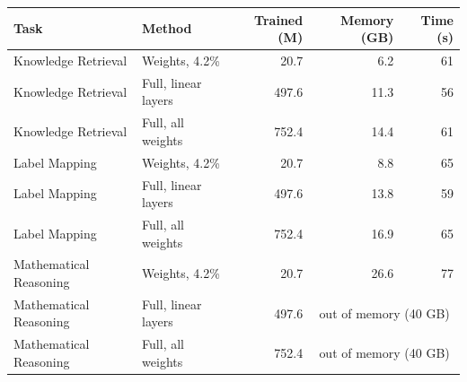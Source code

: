 \begin{tabular}{llrrr}
\toprule
Task & Method & Trained (M) & Memory (GB) & Time (s) \\
\midrule
Knowledge Retrieval & Weights, 4.2\% & 20.7 & 6.2 & 61 \\
Knowledge Retrieval & Full, linear layers & 497.6 & 11.3 & 56 \\
Knowledge Retrieval & Full, all weights & 752.4 & 14.4 & 61 \\
\midrule
Label Mapping & Weights, 4.2\% & 20.7 & 8.8 & 65 \\
Label Mapping & Full, linear layers & 497.6 & 13.8 & 59 \\
Label Mapping & Full, all weights & 752.4 & 16.9 & 65 \\
\midrule
Mathematical Reasoning & Weights, 4.2\% & 20.7 & 26.6 & 77 \\
Mathematical Reasoning & Full, linear layers & 497.6 & \multicolumn{2}{c}{out of memory (40 GB)} \\
Mathematical Reasoning & Full, all weights & 752.4 & \multicolumn{2}{c}{out of memory (40 GB)} \\
\bottomrule
\end{tabular}
